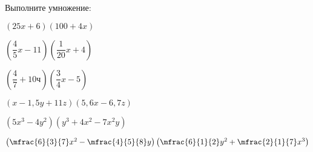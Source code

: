 \begin{homework}[number=2]
\begin{listofex}
	\item Выполните умножение:
	\begin{enumcols}[itemcolumns=2]
		\item \( (25x+6)(100+4x) \)
		\item \( \left(\dfrac{4}{5}x-11\right) \left(\dfrac{1}{20}x+4 \right) \)
		\item \( \left(\dfrac{4}{7}+10ч\right) \left(\dfrac{3}{4}x-5 \right) \)
		\item \( (x-1,5y+11z)(5,6x-6,7z) \)
		\item \( (5x^3-4y^2)(y^3+4x^2-7x^2y) \)
		\item \( \left( \mfrac{6}{3}{7}x^2-\mfrac{4}{5}{8}y \right)\left( \mfrac{6}{1}{2}y^2+\mfrac{2}{1}{7}x^3 \right) \)
	\end{enumcols}
	\end{listofex}
\end{homework}
%
%
